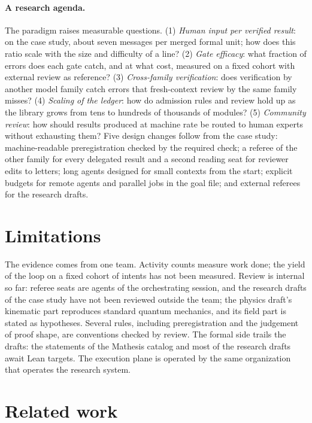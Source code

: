 \documentclass[11pt]{article}
\begin{document}
\paragraph{A research agenda.} The paradigm raises measurable questions.
(1) \emph{Human input per verified result}: on the case study, about seven
messages per merged formal unit; how does this ratio scale with the size and
difficulty of a line? (2) \emph{Gate efficacy}: what fraction of errors does
each gate catch, and at what cost, measured on a fixed cohort with external
review as reference? (3) \emph{Cross-family verification}: does verification
by another model family catch errors that fresh-context review by the same
family misses? (4) \emph{Scaling of the ledger}: how do admission rules and
review hold up as the library grows from tens to hundreds of thousands of
modules? (5) \emph{Community review}: how should results produced at machine
rate be routed to human experts without exhausting them? Five design changes
follow from the case study: machine-readable preregistration checked by the
required check; a referee of the other family for every delegated result and
a second reading seat for reviewer edits to letters; long agents designed
for small contexts from the start; explicit budgets for remote agents and
parallel jobs in the goal file; and external referees for the research
drafts.

\section{Limitations}
\label{sec:limits}
The evidence comes from one team. Activity counts measure work done; the
yield of the loop on a fixed cohort of intents has not been measured. Review
is internal so far: referee seats are agents of the orchestrating session,
and the research drafts of the case study have not been reviewed outside
the team; the physics draft's kinematic part reproduces standard quantum
mechanics, and its field part is stated as hypotheses. Several rules,
including preregistration and the judgement of proof shape, are conventions
checked by review. The formal side trails the drafts: the statements of the
Mathesis catalog and most of the research drafts await Lean targets. The
execution plane is operated by the same organization that operates the
research system.

\section{Related work}
\label{sec:related}
\end{document}
